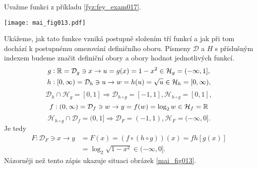 \wikitextrule
\begin{example}\label{MAI:exam025}
  Uvažme funkci z příkladu \ref{fyz:fey_exam017}. 
  
  {\centering
   \captionsetup{type=figure}
%   
   \texttt{[image: mai\_fig013.pdf]}
  \par}
  
  Ukážeme, jak tato funkce vzniká postupně složením tří funkcí a jak při tom dochází k postupnému 
  omezování definičního oboru. Písmeny \(\mathcal{D}\) a \(H\) s příslušným indexem budeme značit 
  definiční obory a obory hodnot jednotlivých funkcí.
  \begin{align*}
    g&:  \mathbb{R} =\mathcal{D}_g\ni x\rightarrow u=g(x) = 1- x^2  \in\mathcal{H}_g=(-\infty,1], \\
    h&: [0,\infty)=\mathcal{D}_h\ni u\rightarrow w=h(u) = \sqrt{u}\in\mathcal{H}_h=[0,\infty),
  \end{align*}
  \begin{equation*}
    \mathcal{D}_h\cap\mathcal{H}_g = [0,1]\Rightarrow\mathcal{D}_{h\circ g}=[-1,1], 
    \mathcal{H}_{h\circ g} = [0,1], 
  \end{equation*}
  \begin{equation*}
    f:(0,\infty)=\mathcal{D}_f\ni w \rightarrow y=f(w)=\log_2w\in\mathcal{H}_f=\mathbb{R}
  \end{equation*}
  \begin{equation*}
    \mathcal{H}_{h\circ g}\cap\mathcal{D}_f = (0,1] 
    \Rightarrow\mathcal{D}_F=(-1,1),\mathcal{H}_F=(-\infty,0]. 
  \end{equation*}
  Je tedy
  \begin{align*}
    F:\mathcal{D}_F\ni x\rightarrow 
    y&=F(x)=(f\circ(h\circ g))(x) = f{h[g(x)]}          \\
     &= \log_2\sqrt{1-x^2}\in(-\infty,0].
  \end{align*}
  Názorněji než tento zápis ukazuje situaci obrázek \ref{mai_fig013}.
\end{example}